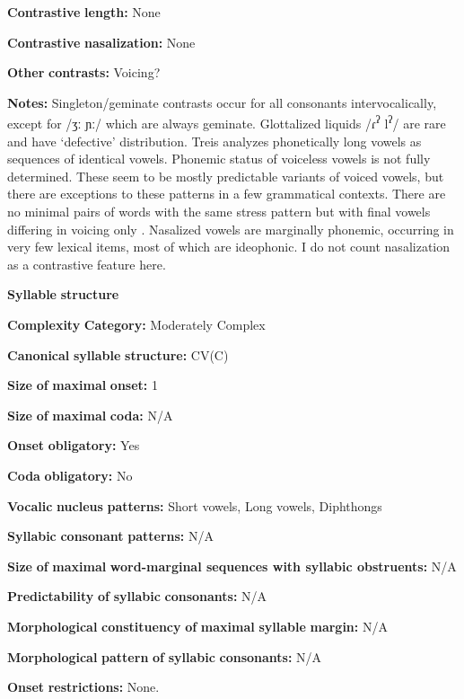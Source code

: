 \textbf{Contrastive} \textbf{length:} None

\textbf{Contrastive} \textbf{nasalization:} None

\textbf{Other} \textbf{contrasts:} Voicing?

\textbf{Notes:} Singleton/geminate contrasts occur for all consonants intervocalically, except for /ʒː ɲː/ which are always geminate. Glottalized liquids /ɾ\textsuperscript{ʔ} l\textsuperscript{ʔ}/ are rare and have ‘defective’ distribution. Treis analyzes phonetically long vowels as sequences of identical vowels. Phonemic status of voiceless vowels is not fully determined. These seem to be mostly predictable variants of voiced vowels, but there are exceptions to these patterns in a few grammatical contexts. There are no minimal pairs of words with the same stress pattern but with final vowels differing in voicing only \citep[20-22]{Treis2008}. Nasalized vowels are marginally phonemic, occurring in very few lexical items, most of which are ideophonic. I do not count nasalization as a contrastive feature here.

\textbf{Syllable} \textbf{structure}

\textbf{Complexity} \textbf{Category:} Moderately Complex

\textbf{Canonical} \textbf{syllable} \textbf{structure:} CV(C) \citep[41]{Treis2008}

\textbf{Size} \textbf{of} \textbf{maximal} \textbf{onset:} 1

\textbf{Size} \textbf{of} \textbf{maximal} \textbf{coda:} N/A

\textbf{Onset} \textbf{obligatory:} Yes

\textbf{Coda} \textbf{obligatory:} No

\textbf{Vocalic} \textbf{nucleus} \textbf{patterns:} Short vowels, Long vowels, Diphthongs

\textbf{Syllabic} \textbf{consonant} \textbf{patterns:} N/A

\textbf{Size} \textbf{of} \textbf{maximal} \textbf{word{}-marginal sequences with syllabic obstruents:} N/A

\textbf{Predictability} \textbf{of} \textbf{syllabic} \textbf{consonants:} N/A

\textbf{Morphological} \textbf{constituency} \textbf{of} \textbf{maximal} \textbf{syllable} \textbf{margin:} N/A

\textbf{Morphological} \textbf{pattern} \textbf{of} \textbf{syllabic} \textbf{consonants:} N/A

\textbf{Onset} \textbf{restrictions:} None.

